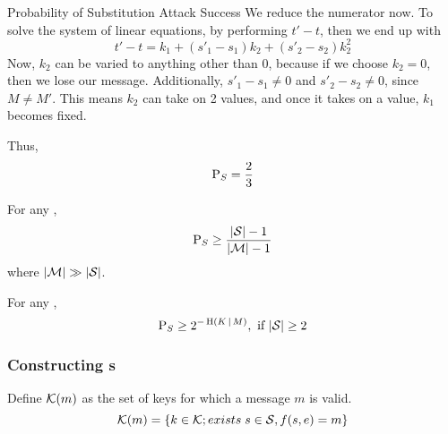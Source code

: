 \begin{example}{Probability of Substitution Attack Success}
  We reduce the numerator now.
  To solve the system of linear equations, by performing $t' - t$, then we end up with
  \begin{equation*}
    t' - t = k_{1} + (s'_{1} - s_{1}) k_{2} + (s'_{2} - s_{2}) k_{2}^{2}
  \end{equation*}
  Now, $k_{2}$ can be varied to anything other than 0, because if we choose $k_{2} = 0$, then we lose our message.
  Additionally, $s'_{1}-s_{1} \neq 0$ and $s'_{2} - s_{2} \neq 0$, since $M \neq M'$.
  This means $k_{2}$ can take on 2 values, and once it takes on a value, $k_{1}$ becomes fixed.

  Thus,
  \begin{equation*}
    \operatorname{\operatorname{P}}_{S} = \frac{2}{3}
  \end{equation*}
\end{example}

\begin{theorem}\label{thm:Attack_Authentication_Code-Substitution-Success_Bounds}
  For any ,
  \begin{equation}\label{eq:Attack_Authentication_Code-Substitution-Success_Bound}
    \operatorname{\operatorname{P}}_{S} \geq \frac{\lvert \operatorname{\mathcal{S}} \rvert - 1}{\lvert \operatorname{\mathcal{M}} \rvert - 1}
  \end{equation}
  where $\lvert \operatorname{\mathcal{M}} \rvert \gg \lvert \operatorname{\mathcal{S}} \rvert$.
\end{theorem}

\begin{theorem}\label{thm:Substitution-Simmons_Bound}
  For any ,
  \begin{equation}\label{eq:Substitution-Simmons_Bound}
    \operatorname{\operatorname{P}}_{S} \geq 2^{-\operatorname{\operatorname{H}}(K \operatorname{\vert} M)}, \text{ if } \lvert \operatorname{\mathcal{S}} \rvert \geq 2
  \end{equation}
\end{theorem}

\subsubsection{Constructing s}\label{subsubsec:Authentication_Code-Construction}
Define $\operatorname{\mathcal{K}}(m)$ as the set of keys for which a message $m$ is valid.
\begin{equation}\label{eq:Authentication_Code-Keys_Message_Valid}
  \operatorname{\mathcal{K}}(m) = \lbrace k \in \operatorname{\mathcal{K}}; exists \; s \in \operatorname{\mathcal{S}}, f(s, e) = m \rbrace
\end{equation}


